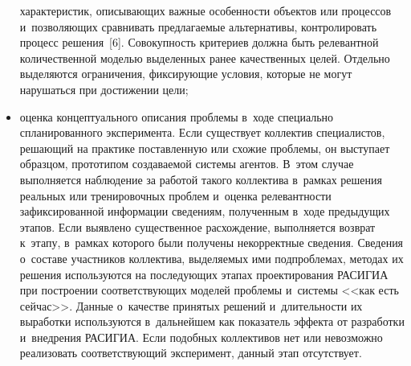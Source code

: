 \begin{multicols}{2}
\begin{itemize}
характеристик, опи\-сы\-ва\-ющих важ\-ные особенности объектов или процессов 
и~поз\-во\-ля\-ющих сравнивать \mbox{пред\-ла\-га\-емые} альтернативы, контролировать 
процесс решения~[6]. Со\-во\-куп\-ность критериев долж\-на быть релевантной 
количественной моделью выделенных ранее качественных целей. Отдельно 
выделяются ограничения, фик\-си\-ру\-ющие условия, которые не могут нарушаться 
при до\-сти\-же\-нии цели;
  \item оценка концептуального описания проб\-ле\-мы в~ходе специально 
спланированного эксперимента. Если существует коллектив специалистов, 
решающий на практике по\-став\-ле\-нную или схожие проб\-ле\-мы, он выступает 
образцом, прототипом создаваемой сис\-те\-мы агентов. В~этом случае 
выполняется наблюдение за работой такого коллектива в~рамках решения 
реальных или тренировочных проб\-лем и~оценка релевантности 
зафиксированной информации сведениям, полученным в~ходе предыду\-щих 
этапов. Если выявлено существенное рас\-хож\-де\-ние, выполняется возврат 
к~этапу, в~рамках которого были получены некорректные сведения. Сведения 
о~составе участников коллектива, вы\-де\-ля\-емых ими под\-проб\-ле\-мах, методах их 
решения используются на по\-сле\-ду\-ющих этапах проектирования 
\mbox{РАСИГИА} при по\-стро\-ении со\-от\-вет\-ст\-ву\-ющих моделей проб\-ле\-мы 
и~сис\-те\-мы <<как есть сейчас>>. Данные о~качестве принятых решений 
и~дли\-тель\-ности их выработки используются в~дальнейшем как показатель 
эффекта от разработки и~внед\-ре\-ния \mbox{РАСИГИА}. Если подобных 
коллективов нет или не\-воз\-мож\-но реализовать со\-от\-вет\-ст\-ву\-ющий эксперимент, 
данный этап отсутствует.
  \end{itemize}
  

\end{multicols}
